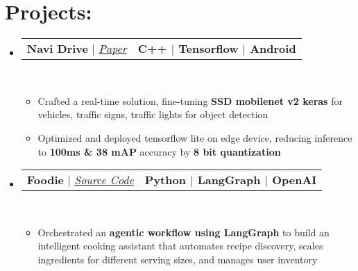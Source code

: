 \documentclass[letterpaper,8pt]{article}
\makeatletter
\newcommand{\resumeItem}[1]{
  \item\small{
    {#1 \vspace{0pt}}
  }
}
\newcommand{\resumeProjectHeading}[2]{
  \item
  \begin{tabular*}{1.001\textwidth}{l@{\extracolsep{\fill}}r}
    \small#1 & \textbf{\small #2}\\
  \end{tabular*}\vspace{-7pt}
}
\newcommand{\resumeSubHeadingListStart}{\begin{itemize}[leftmargin=0.0in, label={}]}
\newcommand{\resumeSubHeadingListEnd}{\end{itemize}}\vspace{0pt}
\newcommand{\resumeItemListStart}{\begin{itemize}[leftmargin=0.15in]}
\newcommand{\resumeItemListEnd}{\end{itemize}\vspace{-5pt}}
\makeatother
\begin{document}
\section{Projects:}
    \resumeSubHeadingListStart
      \resumeProjectHeading{\textbf{{Navi Drive}} $|$ \emph{\href{http://ijrar.org/viewfull.php?\&p_id=IJRAR21B1839}{Paper}}}{C++ $|$ Tensorflow $|$ Android} \\[5mm]
        \resumeItemListStart
          \resumeItem{Crafted a real-time solution, fine-tuning \textbf{SSD mobilenet v2 keras} for vehicles, traffic signs, traffic lights for object  detection}
          \resumeItem{Optimized and deployed tensorflow lite on edge device, reducing inference to \textbf{100ms \& 38 mAP} accuracy by \textbf{8 bit quantization}}
        \resumeItemListEnd
      \vspace{-10pt}
      \resumeProjectHeading{\textbf{{Foodie}} $|$ \emph{\href{https://github.com/dedsec995/Foodiee/}{Source Code}}}{Python $|$ LangGraph $|$ OpenAI} \\[5mm]
        \resumeItemListStart
          \resumeItem{Orchestrated an \textbf{agentic workflow using LangGraph} to build an intelligent cooking assistant that automates recipe discovery, scales ingredients for different serving sizes, and manages user inventory}
        \resumeItemListEnd
    \resumeSubHeadingListEnd
    \vspace{-20pt}
\vspace{10pt}

\vspace{-15pt}
\end{document}
